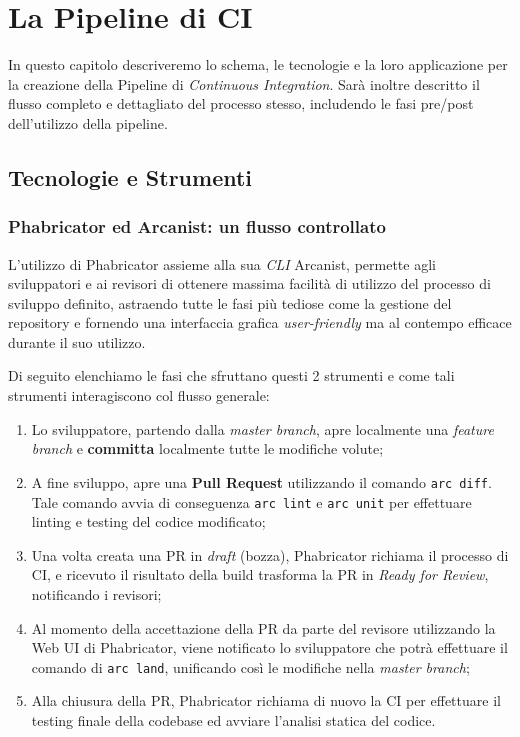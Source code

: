 \documentclass[../main.tex]{subfiles}
\begin{document}
    \chapter{La Pipeline di CI}
    
        In questo capitolo descriveremo lo schema, le tecnologie e la loro applicazione per la creazione della Pipeline di \emph{Continuous Integration}. Sarà inoltre descritto il flusso completo e dettagliato del processo stesso, includendo le fasi pre/post dell'utilizzo della pipeline.
	
    	\section{Tecnologie e Strumenti}
    	
        	\subsection{Phabricator ed Arcanist: un flusso controllato}
        	
        	    L'utilizzo di Phabricator assieme alla sua \emph{CLI} Arcanist, permette agli sviluppatori e ai revisori di ottenere massima facilità di utilizzo del processo di sviluppo definito, astraendo tutte le fasi più tediose come la gestione del repository e fornendo una interfaccia grafica \emph{user-friendly} ma al contempo efficace durante il suo utilizzo.
        	    
        	    Di seguito elenchiamo le fasi che sfruttano questi 2 strumenti e come tali strumenti interagiscono col flusso generale:
        	    \begin{enumerate}
        	        \item Lo sviluppatore, partendo dalla \emph{master branch}, apre localmente una \emph{feature branch} e \textbf{committa} localmente tutte le modifiche volute;
        	        \item A fine sviluppo, apre una \textbf{Pull Request} utilizzando il comando \verb|arc diff|. Tale comando avvia di conseguenza \verb|arc lint| e \verb|arc unit| per effettuare linting e testing del codice modificato;
        	        \item Una volta creata una PR in \emph{draft} (bozza), Phabricator richiama il processo di CI, e ricevuto il risultato della build trasforma la PR in \emph{Ready for Review}, notificando i revisori;
        	        \item Al momento della accettazione della PR da parte del revisore utilizzando la Web UI di Phabricator, viene notificato lo sviluppatore che potrà effettuare il comando di \verb|arc land|, unificando così le modifiche nella \emph{master branch};
        	        \item Alla chiusura della PR, Phabricator richiama di nuovo la CI per effettuare il testing finale della codebase ed avviare l'analisi statica del codice.
        	    \end{enumerate}
        	    
\end{document}
